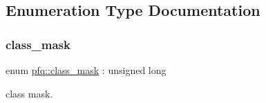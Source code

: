 \subsection{Enumeration Type Documentation}
\mbox{\label{namespacepfq_a96af1f5ed530eff563eb917516758fbb}} 
\subsubsection{\texorpdfstring{class\+\_\+mask}{class\_mask}}
{\footnotesize\ttfamily enum \hyperlink{namespacepfq_a96af1f5ed530eff563eb917516758fbb}{pfq\+::class\+\_\+mask} \+: unsigned long\hspace{0.3cm}{\ttfamily [strong]}}



class mask. 

